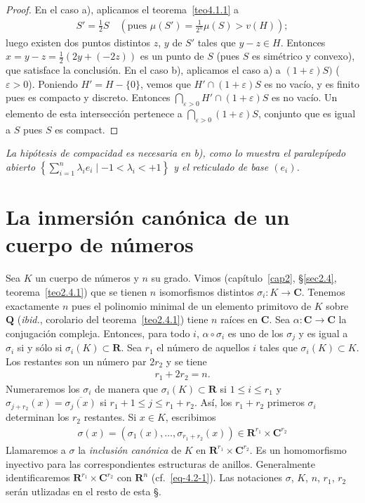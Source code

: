 \documentclass[10pt,oneside,bibtotoc,smallheadings,leqno,a5paper,DIV=12]{scrbook}
\newcommand{\RR}{\mathbf{R}}
\newcommand{\QQ}{\mathbf{Q}}
\newcommand{\CC}{\mathbf{C}}
\newcommand{\QED}{}%
\newcommand{\oline}[1]{\overline{#1}}
\renewcommand{\to}[1][]{\xrightarrow{#1}}
\numberwithin{equation}{section}
\newenvironment{comm}%
	{\begin{trivlist}\item\small\itshape}
	{\end{trivlist}}
\theoremstyle{defi}
\theoremstyle{enonce}
\theoremstyle{rem}
\numberwithin{theorem}{section}
\numberwithin{proposition}{section}
\numberwithin{definition}{section}
\numberwithin{lemma}{section}
\numberwithin{corollary}{section}
\numberwithin{example}{section}
\numberwithin{footnote}{section}%
\begin{document}
\begin{proof}
En el caso a), aplicamos el teorema~\ref{teo4.1.1} a
\begin{gather*}
S'=\frac{1}{2}S\quad\left(\text{pues }\mu(S')=\frac{1}{2^{n}}\mu(S)>v(H)\right);
\end{gather*}
luego existen dos puntos distintos $z$, $y$ de $S'$ tales que $y-z\in H$. Entonces
$x=y-z=\frac{1}{2}(2y+(-2z))$ es un punto de $S$ (pues $S$ es sim\'etrico y convexo),
que satisface la conclusi\'on. En el caso b), aplicamos el caso a) a
$(1+\varepsilon)S)$ ($\varepsilon > 0$). Poniendo $H' = H-\{0\}$, vemos que
$H'\cap (1+\varepsilon)S$ es no vac\'io, y es finito pues es compacto y discreto. Entonces
$\bigcap_{\varepsilon>0}H'\cap (1+\varepsilon)S$ es no vac\'io. Un elemento de esta intersecci\'on pertenece
a $\bigcap_{\varepsilon>0}(1+\varepsilon)S$, conjunto que es igual a $S$ pues $S$ es compact. \QED
\end{proof}

\begin{comm}
La hip\'otesis de compacidad es necesaria en b), como lo muestra el paralep\'ipedo abierto
$\left\{\sum_{i=1}^{n}\lambda_{i}e_{i}\mid-1<\lambda_{i}<+1\right\}$ y el reticulado de base $(e_{i})$.
\end{comm}

\section{La inmersi\'on can\'onica de un cuerpo de n\'umeros}\label{sec4.2}

Sea $K$ un cuerpo de n\'umeros y $n$ su grado. Vimos
(cap\'itulo~\ref{cap2}, \S\ref{sec2.4}, teorema~\ref{teo2.4.1}) que se tienen $n$
isomorfismos distintos $\sigma_{i}:K\to\CC$. Tenemos exactamente $n$ pues el polinomio minimal de
un elemento primitovo de $K$ sobre $\QQ$ ({\em ibid.}, corolario del teorema~\ref{teo2.4.1}) tiene $n$ ra\'ices en $\CC$. Sea
$\alpha:\CC\to\CC$ la conjugaci\'on compleja. Entonces, para todo $i$, $\alpha\circ\sigma_{i}$ es uno
de los $\sigma_{j}$ y es igual a $\sigma_{i}$ si y s\'olo si $\sigma_{i}(K)\subset\RR$. Sea $r_{1}$ el n\'umero
de aquellos $i$ tales que $\sigma_{i}(K)\subset K$. Los restantes son un n\'umero par $2r_{2}$ y
se tiene
\begin{gather}\label{eq-4.2-1}
r_{1}+2r_{2}=n.
\end{gather}
Numeraremos los $\sigma_{i}$ de manera que $\sigma_{i}(K)\subset\RR$ si $1\leq i\leq r_{1}$ y
$\sigma_{j+r_{2}}(x) = \oline{\sigma_{j}(x)}$ si $r_{1}+1\leq j\leq r_{1}+r_{2}$. As\'i, los $r_{1}+r_{2}$
primeros $\sigma_{i}$ determinan los $r_{2}$ restantes. Si $x\in K$, escribimos
\begin{gather}
\sigma(x) = (\sigma_{1}(x),\dots,\sigma_{r_{1}+r_{2}}(x))\in\RR^{r_{1}}\times\CC^{r_{2}}
\end{gather}
Llamaremos a $\sigma$ la {\em inclusi\'on can\'onica} de $K$ en $\RR^{r_{1}}\times\CC^{r_{2}}$. Es un
homomorfismo inyectivo para las correspondientes estructuras de anillos. Generalmente identificaremos
$\RR^{r_{1}}\times\CC^{r_{2}}$ con $\RR^{n}$ (cf.~\eqref{eq-4.2-1}). Las notaciones $\sigma$, $K$, $n$, $r_{1}$, $r_{2}$
ser\'an utlizadas en el resto de esta \S.
\end{document}
